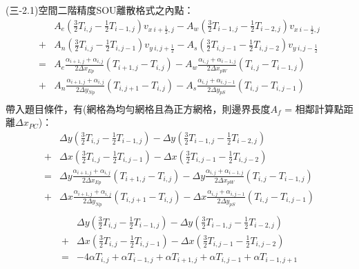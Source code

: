 \documentclass[12pt]{article}
\begin{document}
\noindent (三-2.1)空間二階精度SOU離散格式之內點：
\begin{equation}
  \begin{split}
    &A_{e}(\frac{3}{2}T_{i,j} - \frac{1}{2}T_{i-1,j} )v_{x\ i+\frac{1}{2},j} - A_{w}(\frac{3}{2}T_{i-1,j} - \frac{1}{2}T_{i-2,j} )v_{x\ i-\frac{1}{2},j} \\
     + &A_{n}(\frac{3}{2}T_{i,j} - \frac{1}{2}T_{i,j-1} )v_{y\ i,j+\frac{1}{2}} - A_{s}(\frac{3}{2}T_{i,j-1} - \frac{1}{2}T_{i,j-2} )v_{y\ i,j-\frac{1}{2}} \\
     = & A_{e}\frac{\alpha_{i+1,j}+\alpha_{i,j}}{2\Delta x_{Ep}}(T_{i+1,j}-T_{i,j}) - A_{w}\frac{\alpha_{i,j}+\alpha_{i-1,j}}{2\Delta x_{pW}}(T_{i,j} - T_{i-1,j}) \\
     + & A_{n}\frac{\alpha_{i+1,j}+\alpha_{i,j}}{2\Delta y_{Np}}(T_{i,j+1}-T_{i,j}) - A_{s}\frac{\alpha_{i,j}+\alpha_{i,j-1}}{2\Delta y_{pS}}(T_{i,j}-T_{i,j-1})\\
  \end{split}
\end{equation}
\noindent 帶入題目條件，有(網格為均勻網格且為正方網格，則邊界長度$A_{f}$ = 相鄰計算點距離$\Delta x_{PC}$)：
\begin{equation}
  \begin{split}
    &\Delta y (\frac{3}{2}T_{i,j} - \frac{1}{2}T_{i-1,j} ) - \Delta y(\frac{3}{2}T_{i-1,j} - \frac{1}{2}T_{i-2,j} ) \\
     + &\Delta x(\frac{3}{2}T_{i,j} - \frac{1}{2}T_{i,j-1} ) - \Delta x(\frac{3}{2}T_{i,j-1} - \frac{1}{2}T_{i,j-2} )\\
     = &\Delta y\frac{\alpha_{i+1,j}+\alpha_{i,j}}{2\Delta x_{Ep}}(T_{i+1,j}-T_{i,j}) -\Delta y\frac{\alpha_{i,j}+\alpha_{i-1,j}}{2\Delta x_{pW}}(T_{i,j} - T_{i-1,j}) \\
     + &\Delta x\frac{\alpha_{i+1,j}+\alpha_{i,j}}{2\Delta y_{Np}}(T_{i,j+1}-T_{i,j}) - \Delta x\frac{\alpha_{i,j}+\alpha_{i,j-1}}{2\Delta y_{pS}}(T_{i,j}-T_{i,j-1})\\
  \end{split} 
\end{equation}
\vspace{0.7em}
\begin{equation}
  \begin{split}
    &\Delta y (\frac{3}{2}T_{i,j} - \frac{1}{2}T_{i-1,j} ) - \Delta y(\frac{3}{2}T_{i-1,j} - \frac{1}{2}T_{i-2,j} ) \\
     + &\Delta x(\frac{3}{2}T_{i,j} - \frac{1}{2}T_{i,j-1} ) - \Delta x(\frac{3}{2}T_{i,j-1} - \frac{1}{2}T_{i,j-2} )\\
     = &-4\alpha T_{i,j}+ \alpha T_{i-1,j}+ \alpha T_{i+1,j}+ \alpha T_{i,j-1}+ \alpha T_{i-1,j+1}\\
 \end{split} 
\end{equation}
\end{document}

